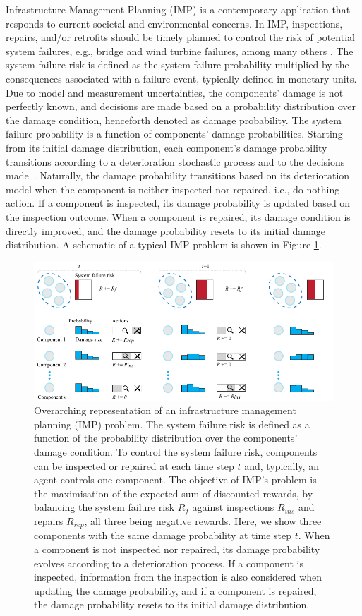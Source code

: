 Infrastructure Management Planning (IMP) is a contemporary application that responds to current societal and environmental concerns.
In IMP, inspections, repairs, and/or retrofits should be timely planned to control the risk of potential system failures, e.g., bridge and wind turbine failures, among many others \citep{morato2022optimal}.
The system failure risk is defined as the system failure probability multiplied by the consequences associated with a failure event, typically defined in monetary units.
Due to model and measurement uncertainties, the components' damage is not perfectly known, and decisions are made based on a probability distribution over the damage condition, henceforth denoted as damage probability.
The system failure probability is a function of components' damage probabilities.
Starting from its initial damage distribution, each component's damage probability transitions according to a deterioration stochastic process and to the decisions made~\citep{morato2022optimal}.
Naturally, the damage probability transitions based on its deterioration model when the component is neither inspected nor repaired, i.e., do-nothing action.
If a component is inspected, its damage probability is updated based on the inspection outcome.
When a component is repaired, its damage condition is directly improved, and the damage probability resets to its initial damage distribution.
A schematic of a typical IMP problem is shown in Figure \ref{fig:ch5_imp_problem}.

\begin{figure}
\centering
\includegraphics[width=\textwidth]{tex_thesis/figures/ch5/imp_intro.pdf}
\caption{Overarching representation of an infrastructure management planning (IMP) problem.
The system failure risk is defined as a function of the probability distribution over the components' damage condition. 
To control the system failure risk, components can be inspected or repaired at each time step $t$ and, typically, an agent controls one component.
The objective of IMP's problem is the maximisation of the expected sum of discounted rewards, by balancing the system failure risk $R_f$ against inspections $R_{ins}$ and repairs $R_{rep}$, all three being negative rewards.
Here, we show three components with the same damage probability at time step $t$.
When a component is not inspected nor repaired, its damage probability evolves according to a deterioration process. If a component is inspected, information from the inspection is also considered when updating the damage probability, and if a component is repaired, the damage probability resets to its initial damage distribution.}
\label{fig:ch5_imp_problem}
\end{figure}

